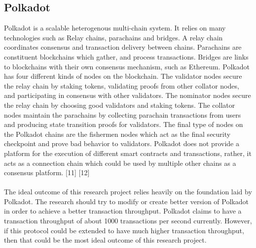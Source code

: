 \documentclass[a4paper,twoside,phd]{BYUPhys}
\begin{document}
\subsection{Polkadot}
Polkadot is a scalable heterogenous multi-chain system. It relies on many technologies such as Relay chains, parachains and bridges. A relay chain coordinates consensus and transaction delivery between chains. Parachains are constituent blockchains which gather, and process transactions. Bridges are links to blockchains with their own consensus mechanism, such as Ethereum. Polkadot has four different kinds of nodes on the blockchain. The validator nodes secure the relay chain by staking tokens, validating proofs from other collator nodes, and participating in consensus with other validators. The nominator nodes secure the relay chain by choosing good validators and staking tokens. The collator nodes maintain the parachains by collecting parachain transactions from users and producing state transition proofs for validators. The final type of nodes on the Polkadot chains are the fishermen nodes which act as the final security checkpoint and prove bad behavior to validators. Polkadot does not provide a platform for the execution of different smart contracts and transactions, rather, it acts as a connection chain which could be used by multiple other chains as a consensus platform. [11] [12]
\\
\\
The ideal outcome of this research project relies heavily on the foundation laid by Polkadot. The research should try to modify or create better version of Polkadot in order to achieve a better transaction throughput. Polkadot claims to have a transaction throughput of about 1000 transactions per second currently. However, if this protocol could be extended to have much higher transaction throughput, then that could be the most ideal outcome of this research project.
\end{document}
